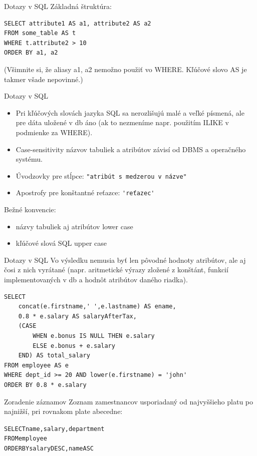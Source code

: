 \documentclass[12pt]{beamer}
\begin{document}
\begin{frame}[fragile]{Dotazy v SQL}
Základná štruktúra:
\begin{verbatim}
SELECT attribute1 AS a1, attribute2 AS a2
FROM some_table AS t
WHERE t.attribute2 > 10
ORDER BY a1, a2
\end{verbatim}
(Všimnite si, že aliasy a1, a2 nemožno použiť vo WHERE. Kľúčové slovo AS je takmer všade nepovinné.)
\end{frame}

\begin{frame}[fragile]{Dotazy v SQL}
\begin{itemize}
\item Pri kľúčových slovách jazyka SQL sa nerozlišujú malé a veľké písmená,
ale pre dáta uložené v db áno (ak to nezmeníme napr. použitím ILIKE v podmienke za WHERE).
\item Case-sensitivity názvov tabuliek a atribútov závisí od DBMS a operačného systému.
\item Úvodzovky pre stĺpce: \verb|"atribút s medzerou v názve"|
\item Apostrofy pre konštantné reťazce: \verb|'reťazec'|
\end{itemize}

Bežné konvencie:
\begin{itemize}
\item názvy tabuliek aj atribútov lower case
\item kľúčové slová SQL upper case
\end{itemize}
\end{frame}

\begin{frame}[fragile]{Dotazy v SQL}
Vo výsledku nemusia byť len pôvodné hodnoty atribútov, ale aj čosi z nich vyrátané (napr. aritmetické výrazy zložené z konštánt, funkcií implementovaných v db a hodnôt atribútov daného riadka).\\[3mm]

\begin{verbatim}
SELECT
    concat(e.firstname,' ',e.lastname) AS ename,
    0.8 * e.salary AS salaryAfterTax,
    (CASE
        WHEN e.bonus IS NULL THEN e.salary
        ELSE e.bonus + e.salary
    END) AS total_salary
FROM employee AS e
WHERE dept_id >= 20 AND lower(e.firstname) = 'john'
ORDER BY 0.8 * e.salary
\end{verbatim}
\end{frame}

\begin{frame}[fragile]{Zoradenie záznamov}
Zoznam zamestnancov usporiadaný od najvyššieho platu po najnižší, pri rovnakom plate abecedne:
\begin{alltt}
SELECT name, salary, department
FROM employee
\alert{ORDER BY} salary DESC, name ASC
\end{alltt}
\end{frame}
\end{document}
